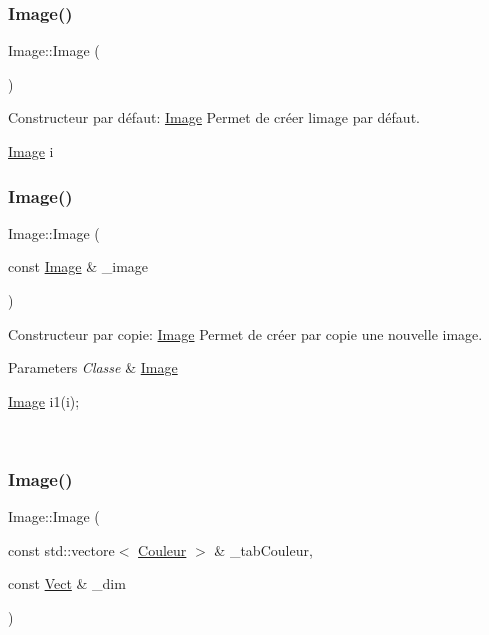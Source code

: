 \subsubsection{\texorpdfstring{Image()}{Image()}\hspace{0.1cm}{\footnotesize\ttfamily [1/4]}}
{\footnotesize\ttfamily Image\+::\+Image (\begin{DoxyParamCaption}{ }\end{DoxyParamCaption})}



Constructeur par défaut\+: \hyperlink{classImage}{Image} Permet de créer l\textquotesingle{}image par défaut. 


\begin{DoxyCode}
\hyperlink{classImage}{Image} i
\end{DoxyCode}
 \mbox{\label{classImage_a18dba28d7d81f51cabf37e0044bd2d6c}} 
\subsubsection{\texorpdfstring{Image()}{Image()}\hspace{0.1cm}{\footnotesize\ttfamily [2/4]}}
{\footnotesize\ttfamily Image\+::\+Image (\begin{DoxyParamCaption}\item[{const \hyperlink{classImage}{Image} \&}]{\+\_\+image }\end{DoxyParamCaption})}



Constructeur par copie\+: \hyperlink{classImage}{Image} Permet de créer par copie une nouvelle image. 


\begin{DoxyParams}{Parameters}
{\em Classe} & \hyperlink{classImage}{Image} 
\begin{DoxyCode}
\hyperlink{classImage}{Image} i1(i);
\end{DoxyCode}
 \\
\hline
\end{DoxyParams}
\mbox{\label{classImage_ae8b4bc2d9cf6b0591f9c16829e0b1dad}} 
\subsubsection{\texorpdfstring{Image()}{Image()}\hspace{0.1cm}{\footnotesize\ttfamily [3/4]}}
{\footnotesize\ttfamily Image\+::\+Image (\begin{DoxyParamCaption}\item[{const std\+::vectore$<$ \hyperlink{classCouleur}{Couleur} $>$ \&}]{\+\_\+tab\+Couleur,  }\item[{const \hyperlink{classVect}{Vect} \&}]{\+\_\+dim }\end{DoxyParamCaption})}



